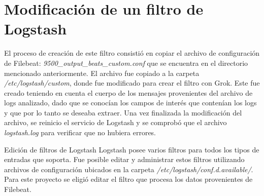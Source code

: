 \chapter{Modificación de un filtro de Logstash}
El proceso de creación de este filtro consistió en copiar el archivo de configuración de Filebeat: \textit{9500\_output\_beats\_custom.conf} que se encuentra en el directorio mencionado anteriormente. El archivo fue copiado a la carpeta \textit{/etc/logstash/custom}, donde fue modificado para crear el filtro con Grok. Este fue creado teniendo en cuenta el cuerpo de los mensajes provenientes del archivo de logs analizado, dado que se conocían los campos de interés que contenían los logs y que por lo tanto se deseaba extraer. Una vez finalizada la modificación del archivo, se reinicio el servicio de Logstash y se comprobó que el archivo \textit{logstash.log} para verificar que no hubiera errores.\par
\begin{section}{Edición de filtros de Logstash}
Logstash posee varios filtros para todos los tipos de entradas que soporta.
Fue posible editar y administrar estos filtros utilizando archivos de configuración ubicados en la carpeta \textit{/etc/logstash/conf.d.available/}. Para este proyecto se eligió editar el filtro que procesa los datos provenientes de Filebeat.\par
\end{section}



    


 
  

